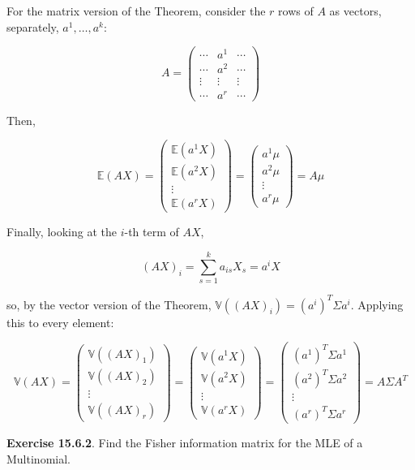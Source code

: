 For the matrix version of the Theorem, consider the \(r\) rows of \(A\)
as vectors, separately, \(a^{1}, \dots, a^{k}\):

\[ A = \begin{pmatrix}
\cdots & a^{1} & \cdots \\
\cdots & a^{2} & \cdots \\
\vdots & \vdots & \vdots \\
\cdots & a^r & \cdots
\end{pmatrix}\]

Then,

\[ \mathbb{E}(AX) = \begin{pmatrix}
\mathbb{E}(a^{1} X) \\
\mathbb{E}(a^{2} X) \\
\vdots \\
\mathbb{E}(a^r X)
\end{pmatrix} = \begin{pmatrix}
a^{1} \mu \\
a^{2} \mu \\
\vdots \\
a^r \mu
\end{pmatrix} = A\mu
\]

Finally, looking at the \(i\)-th term of \(AX\),

\[(AX)_{i} = \sum_{s=1}^{k} a_{is} X_s = a^{i} X\]

so, by the vector version of the Theorem,
\(\mathbb{V}((AX)_{i}) = (a^{i})^T \Sigma a^{i}\). Applying this to every
element:

\[\mathbb{V}(AX) = \begin{pmatrix}
\mathbb{V}((AX)_{1}) \\
\mathbb{V}((AX)_{2}) \\
\vdots \\
\mathbb{V}((AX)_r)
\end{pmatrix} = \begin{pmatrix}
\mathbb{V}(a^{1} X) \\
\mathbb{V}(a^{2} X) \\
\vdots \\
\mathbb{V}(a^r X)
\end{pmatrix} = \begin{pmatrix}
(a^{1})^T \Sigma a^{1} \\
(a^{2})^T \Sigma a^{2} \\
\vdots \\
(a^r)^T \Sigma a^r
\end{pmatrix} = A \Sigma A^T\]

\textbf{Exercise 15.6.2}. Find the Fisher information matrix for the MLE
of a Multinomial.

